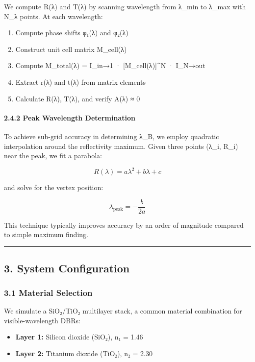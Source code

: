 \documentclass[
]{article}
\providecommand{\tightlist}{%
  \setlength{\itemsep}{0pt}\setlength{\parskip}{0pt}}
\begin{document}
We compute R(λ) and T(λ) by scanning wavelength from λ\_min to λ\_max
with N\_λ points. At each wavelength:

\begin{enumerate}
\def\labelenumi{\arabic{enumi}.}
\tightlist
\item
  Compute phase shifts φ₁(λ) and φ₂(λ)
\item
  Construct unit cell matrix M\_cell(λ)
\item
  Compute M\_total(λ) = I\_in→1 · {[}M\_cell(λ){]}\^{}N · I\_N→out
\item
  Extract r(λ) and t(λ) from matrix elements
\item
  Calculate R(λ), T(λ), and verify A(λ) ≈ 0
\end{enumerate}

\paragraph{2.4.2 Peak Wavelength
Determination}\label{peak-wavelength-determination}

To achieve sub-grid accuracy in determining λ\_B, we employ quadratic
interpolation around the reflectivity maximum. Given three points (λ\_i,
R\_i) near the peak, we fit a parabola:

\[R(\lambda) = a\lambda^2 + b\lambda + c\]

and solve for the vertex position:

\[\lambda_{\text{peak}} = -\frac{b}{2a}\]

This technique typically improves accuracy by an order of magnitude
compared to simple maximum finding.

\begin{center}\rule{0.5\linewidth}{0.5pt}\end{center}

\subsection{3. System Configuration}\label{system-configuration}

\subsubsection{3.1 Material Selection}\label{material-selection}

We simulate a SiO₂/TiO₂ multilayer stack, a common material combination
for visible-wavelength DBRs:

\begin{itemize}
\tightlist
\item
  \textbf{Layer 1:} Silicon dioxide (SiO₂), n₁ = 1.46
\item
  \textbf{Layer 2:} Titanium dioxide (TiO₂), n₂ = 2.30
\end{itemize}
\end{document}
